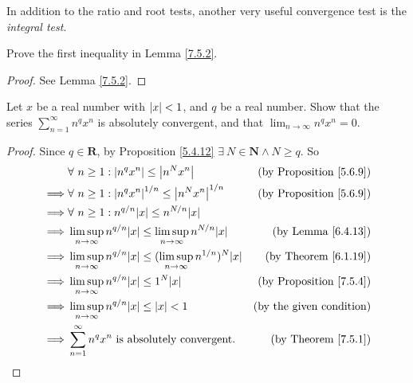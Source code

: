 \begin{remark}\label{7.5.5}
    In addition to the ratio and root tests, another very useful convergence test is the \emph{integral test}.
\end{remark}

\exercisesection

\begin{exercise}\label{ex 7.5.1}
    Prove the first inequality in Lemma \ref{7.5.2}.
\end{exercise}

\begin{proof}
    See Lemma \ref{7.5.2}.
\end{proof}

\begin{exercise}\label{ex 7.5.2}
    Let \(x\) be a real number with \(\abs*{x} < 1\), and \(q\) be a real number.
    Show that the series \(\sum_{n = 1}^\infty n^q x^n\) is absolutely convergent, and that \(\lim_{n \to \infty} n^q x^n = 0\).
\end{exercise}

\begin{proof}
    Since \(q \in \mathbf{R}\), by Proposition \ref{5.4.12} \(\exists\ N \in \mathbf{N} \land N \geq q\).
    So
    \begin{align*}
                 & \forall\ n \geq 1 : \abs*{n^q x^n} \leq \abs*{n^N x^n}                                         & \text{(by Proposition \ref{5.6.9})} \\
        \implies & \forall\ n \geq 1 : \abs*{n^q x^n}^{1 / n} \leq \abs*{n^N x^n}^{1 / n}                         & \text{(by Proposition \ref{5.6.9})} \\
        \implies & \forall\ n \geq 1 : n^{q / n} \abs*{x} \leq n^{N / n} \abs*{x}                                                                       \\
        \implies & \limsup_{n \to \infty} n^{q / n} \abs*{x} \leq \limsup_{n \to \infty} n^{N / n} \abs*{x}     & \text{(by Lemma \ref{6.4.13})}      \\
        \implies & \limsup_{n \to \infty} n^{q / n} \abs*{x} \leq (\limsup_{n \to \infty} n^{1 / n})^N \abs*{x} & \text{(by Theorem \ref{6.1.19})}    \\
        \implies & \limsup_{n \to \infty} n^{q / n} \abs*{x} \leq 1^N \abs*{x}                                   & \text{(by Proposition \ref{7.5.4})} \\
        \implies & \limsup_{n \to \infty} n^{q / n} \abs*{x} \leq \abs*{x} < 1                                   & \text{(by the given condition)}     \\
        \implies & \sum_{n = 1}^\infty n^q x^n \text{ is absolutely convergent}.                                  & \text{(by Theorem \ref{7.5.1})}
    \end{align*}
\end{proof}

